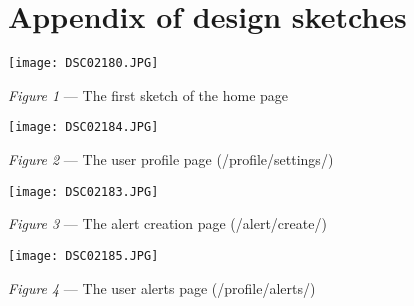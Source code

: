 \clearpage
\section{Appendix of design sketches}

\begin{flushleft}
    \texttt{[image: DSC02180.JPG]}

    \emph{Figure 1} --- The first sketch of the home page
    \vspace{5mm}

    \texttt{[image: DSC02184.JPG]}

    \emph{Figure 2} --- The user profile page (/profile/settings/)
    \vspace{5mm}

    \texttt{[image: DSC02183.JPG]}

    \emph{Figure 3} --- The alert creation page (/alert/create/)
    \vspace{5mm}

    \texttt{[image: DSC02185.JPG]}

    \emph{Figure 4} --- The user alerts page (/profile/alerts/)
    \vspace{5mm}
\end{flushleft}
